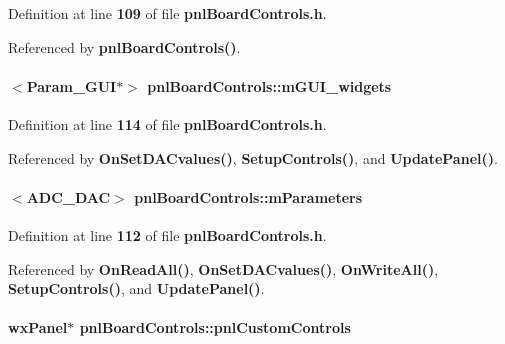 Definition at line {\bf 109} of file {\bf pnl\+Board\+Controls.\+h}.



Referenced by {\bf pnl\+Board\+Controls()}.

\paragraph[{m\+G\+U\+I\+\_\+widgets}]{$<${\bf Param\+\_\+\+G\+UI}$\ast$$>$ pnl\+Board\+Controls\+::m\+G\+U\+I\+\_\+widgets\hspace{0.3cm}{\ttfamily [protected]}}\label{classpnlBoardControls_a74a936a4a239bf1bf386768a539b7540}


Definition at line {\bf 114} of file {\bf pnl\+Board\+Controls.\+h}.



Referenced by {\bf On\+Set\+D\+A\+Cvalues()}, {\bf Setup\+Controls()}, and {\bf Update\+Panel()}.

\paragraph[{m\+Parameters}]{$<${\bf A\+D\+C\+\_\+\+D\+AC}$>$ pnl\+Board\+Controls\+::m\+Parameters\hspace{0.3cm}{\ttfamily [protected]}}\label{classpnlBoardControls_a6fe1622849ebc04db81ca7ef71aea999}


Definition at line {\bf 112} of file {\bf pnl\+Board\+Controls.\+h}.



Referenced by {\bf On\+Read\+All()}, {\bf On\+Set\+D\+A\+Cvalues()}, {\bf On\+Write\+All()}, {\bf Setup\+Controls()}, and {\bf Update\+Panel()}.

\paragraph[{pnl\+Custom\+Controls}]{\setlength{\rightskip}{0pt plus 5cm}wx\+Panel$\ast$ pnl\+Board\+Controls\+::pnl\+Custom\+Controls\hspace{0.3cm}{\ttfamily [protected]}}\label{classpnlBoardControls_a5c3d01c9fd6b3cb7ec8e9b61f19daa27}


